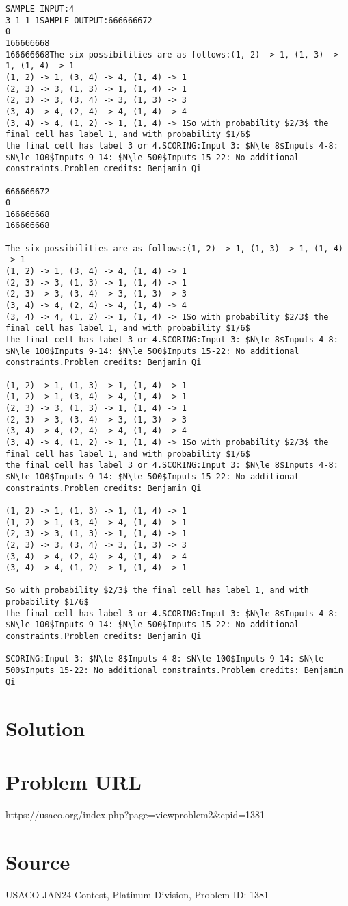 \documentclass[12pt]{article}
\begin{document}
\begin{verbatim}
SAMPLE INPUT:4
3 1 1 1SAMPLE OUTPUT:666666672
0
166666668
166666668The six possibilities are as follows:(1, 2) -> 1, (1, 3) -> 1, (1, 4) -> 1
(1, 2) -> 1, (3, 4) -> 4, (1, 4) -> 1
(2, 3) -> 3, (1, 3) -> 1, (1, 4) -> 1
(2, 3) -> 3, (3, 4) -> 3, (1, 3) -> 3
(3, 4) -> 4, (2, 4) -> 4, (1, 4) -> 4
(3, 4) -> 4, (1, 2) -> 1, (1, 4) -> 1So with probability $2/3$ the final cell has label 1, and with probability $1/6$
the final cell has label 3 or 4.SCORING:Input 3: $N\le 8$Inputs 4-8: $N\le 100$Inputs 9-14: $N\le 500$Inputs 15-22: No additional constraints.Problem credits: Benjamin Qi

666666672
0
166666668
166666668

The six possibilities are as follows:(1, 2) -> 1, (1, 3) -> 1, (1, 4) -> 1
(1, 2) -> 1, (3, 4) -> 4, (1, 4) -> 1
(2, 3) -> 3, (1, 3) -> 1, (1, 4) -> 1
(2, 3) -> 3, (3, 4) -> 3, (1, 3) -> 3
(3, 4) -> 4, (2, 4) -> 4, (1, 4) -> 4
(3, 4) -> 4, (1, 2) -> 1, (1, 4) -> 1So with probability $2/3$ the final cell has label 1, and with probability $1/6$
the final cell has label 3 or 4.SCORING:Input 3: $N\le 8$Inputs 4-8: $N\le 100$Inputs 9-14: $N\le 500$Inputs 15-22: No additional constraints.Problem credits: Benjamin Qi

(1, 2) -> 1, (1, 3) -> 1, (1, 4) -> 1
(1, 2) -> 1, (3, 4) -> 4, (1, 4) -> 1
(2, 3) -> 3, (1, 3) -> 1, (1, 4) -> 1
(2, 3) -> 3, (3, 4) -> 3, (1, 3) -> 3
(3, 4) -> 4, (2, 4) -> 4, (1, 4) -> 4
(3, 4) -> 4, (1, 2) -> 1, (1, 4) -> 1So with probability $2/3$ the final cell has label 1, and with probability $1/6$
the final cell has label 3 or 4.SCORING:Input 3: $N\le 8$Inputs 4-8: $N\le 100$Inputs 9-14: $N\le 500$Inputs 15-22: No additional constraints.Problem credits: Benjamin Qi

(1, 2) -> 1, (1, 3) -> 1, (1, 4) -> 1
(1, 2) -> 1, (3, 4) -> 4, (1, 4) -> 1
(2, 3) -> 3, (1, 3) -> 1, (1, 4) -> 1
(2, 3) -> 3, (3, 4) -> 3, (1, 3) -> 3
(3, 4) -> 4, (2, 4) -> 4, (1, 4) -> 4
(3, 4) -> 4, (1, 2) -> 1, (1, 4) -> 1

So with probability $2/3$ the final cell has label 1, and with probability $1/6$
the final cell has label 3 or 4.SCORING:Input 3: $N\le 8$Inputs 4-8: $N\le 100$Inputs 9-14: $N\le 500$Inputs 15-22: No additional constraints.Problem credits: Benjamin Qi

SCORING:Input 3: $N\le 8$Inputs 4-8: $N\le 100$Inputs 9-14: $N\le 500$Inputs 15-22: No additional constraints.Problem credits: Benjamin Qi
\end{verbatim}

\section*{Solution}


\section*{Problem URL}
https://usaco.org/index.php?page=viewproblem2&cpid=1381

\section*{Source}
USACO JAN24 Contest, Platinum Division, Problem ID: 1381
\end{document}
